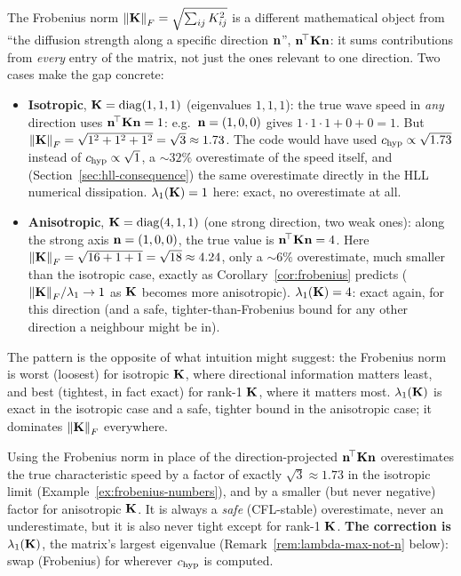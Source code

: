 \begin{example}
\label{ex:frobenius-numbers}
The Frobenius norm $\norm{\mathbf{K}}_F=\sqrt{\sum_{ij}K_{ij}^2}$ is a
different mathematical object from ``the diffusion strength along a
specific direction $\mathbf{n}$'', $\mathbf{n}^{\!\top}\mathbf{K}\mathbf{n}$: it sums
contributions from \emph{every} entry of the matrix, not just the ones
relevant to one direction. Two cases make the gap concrete:
\begin{itemize}
\item \textbf{Isotropic}, $\mathbf{K}=\mathrm{diag}(1,1,1)$ (eigenvalues
  $1,1,1$): the true wave speed in \emph{any} direction uses
  $\mathbf{n}^{\!\top}\mathbf{K}\mathbf{n}=1$: e.g.\ $\mathbf{n}=(1,0,0)$ gives
  $1\cdot1\cdot1+0+0=1$. But $\norm{\mathbf{K}}_F=\sqrt{1^2+1^2+1^2}=\sqrt3\approx1.73$.
  The code would have used $c_{\rm hyp}\propto\sqrt{1.73}$ instead of
  $c_{\rm hyp}\propto\sqrt1$, a $\sim32\%$ overestimate of the speed itself,
  and (Section~\ref{sec:hll-consequence}) the same overestimate directly
  in the HLL numerical dissipation. $\lambda_1(\mathbf{K})=1$ here: exact, no
  overestimate at all.
\item \textbf{Anisotropic}, $\mathbf{K}=\mathrm{diag}(4,1,1)$ (one strong
  direction, two weak ones): along the strong axis $\mathbf{n}=(1,0,0)$, the
  true value is $\mathbf{n}^{\!\top}\mathbf{K}\mathbf{n}=4$. Here
  $\norm{\mathbf{K}}_F=\sqrt{16+1+1}=\sqrt{18}\approx4.24$, only a
  $\sim6\%$ overestimate, much smaller than the isotropic case, exactly
  as Corollary~\ref{cor:frobenius} predicts ($\norm{\mathbf{K}}_F/\lambda_1\to1$
  as $\mathbf{K}$ becomes more anisotropic). $\lambda_1(\mathbf{K})=4$: exact again,
  for this direction (and a safe, tighter-than-Frobenius bound for any
  other direction a neighbour might be in).
\end{itemize}
The pattern is the opposite of what intuition might suggest: the
Frobenius norm is worst (loosest) for isotropic $\mathbf{K}$, where directional
information matters least, and best (tightest, in fact exact) for
rank-1 $\mathbf{K}$, where it matters most. $\lambda_1(\mathbf{K})$ is exact in the
isotropic case and a safe, tighter bound in the anisotropic case; it
dominates $\norm{\mathbf{K}}_F$ everywhere.
\end{example}
Using the Frobenius norm in place of the direction-projected
$\mathbf{n}^{\!\top}\mathbf{K}\mathbf{n}$ overestimates the true characteristic speed
by a factor of exactly $\sqrt3\approx1.73$ in the isotropic limit
(Example~\ref{ex:frobenius-numbers}), and by a smaller (but never
negative) factor for anisotropic $\mathbf{K}$. It is always a \emph{safe}
(CFL-stable) overestimate, never an underestimate, but it is also never
tight except for rank-1 $\mathbf{K}$. \textbf{The correction is
$\lambda_1(\mathbf{K})$}, the matrix's largest eigenvalue (Remark~\ref{rem:lambda-max-not-n}
below): swap  (Frobenius) for
 wherever $c_{\rm hyp}$ is
computed.


